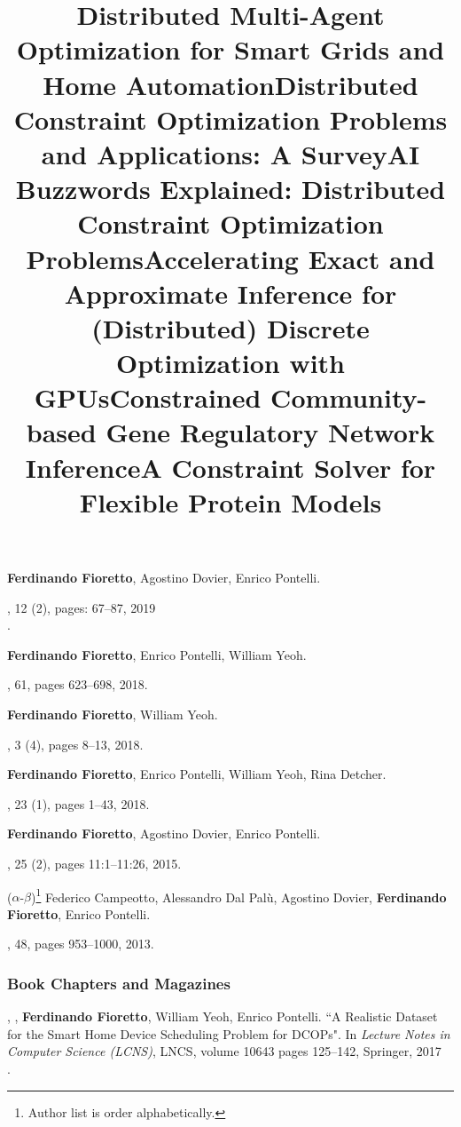 \item 
	{\bf Ferdinando Fioretto}, Agostino Dovier, Enrico Pontelli.
	\title{Distributed Multi-Agent Optimization for Smart Grids and Home Automation}
	,  12 (2), pages: 67--87, 2019\\
	.

\item
	{\bf Ferdinando Fioretto}, Enrico Pontelli, William Yeoh.
	\title{Distributed Constraint Optimization Problems and Applications: A Survey}
	\JAIR, 61, pages 623--698, 2018. 

\item 
	{\bf Ferdinando Fioretto}, William Yeoh. 
	\title{AI Buzzwords Explained: Distributed Constraint Optimization Problems}
	, 3 (4), pages 8--13, 2018. 

\item 
	{\bf Ferdinando Fioretto}, Enrico Pontelli, William Yeoh, Rina Detcher.
	\title{Accelerating Exact and Approximate Inference for (Distributed) Discrete Optimization with GPUs}
	, 23 (1), pages 1--43, 2018. 

\item 
	{\bf Ferdinando Fioretto}, Agostino Dovier, Enrico Pontelli. 
	\title{Constrained Community-based Gene Regulatory Network Inference}
	, 25 (2), pages 11:1--11:26, 2015.

\item 
	($\alpha$-$\beta$)\footnote{Author list is order alphabetically.} 
	Federico Campeotto, Alessandro Dal Pal\`{u}, Agostino Dovier,  {\bf Ferdinando Fioretto}, Enrico Pontelli. 
	\title{A Constraint Solver for Flexible Protein Models}
	\JAIR, 48, pages 953--1000,
	2013.	
\endEnum

\subsubsection*{\sc Book Chapters and Magazines}
\renewcommand{\labelenumi}{b\theenumi.} 
\beginEnum
\item
	, , {\bf Ferdinando Fioretto}, William Yeoh, Enrico Pontelli. 
	{``A Realistic Dataset for the Smart Home Device Scheduling Problem for DCOPs"}.
	In \emph{Lecture Notes in Computer Science (LCNS)}, LNCS, volume 10643 pages 125--142, Springer, 2017 \\
	.

